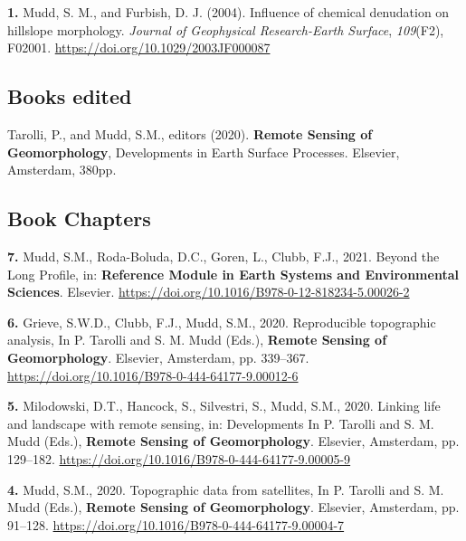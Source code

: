 \documentclass[10pt, a4paper]{article}
\newcommand{\years}[1]{\marginnote{\scriptsize #1}}
\begin{document}
\years{2004}\hangindent=0.7cm\textbf{1. }Mudd, S. M., and Furbish, D. J. (2004). Influence of chemical denudation on hillslope morphology. \textit{Journal of Geophysical Research-Earth Surface}, \textit{109}(F2), F02001. \href{https://doi.org/10.1029/2003JF000087}{https://doi.org/10.1029/2003JF000087}\par


\subsection*{Books edited}
\years{2020}\hangindent=0.7cm Tarolli, P., and Mudd, S.M., editors (2020). \textbf{Remote Sensing of Geomorphology}, Developments in Earth Surface Processes. Elsevier, Amsterdam, 380pp.

\subsection*{Book Chapters}
\noindent
\years{2021}\hangindent=0.7cm\textbf{7. }Mudd, S.M., Roda-Boluda, D.C., Goren, L., Clubb, F.J., 2021. Beyond the Long Profile, in: \textbf{Reference Module in Earth Systems and Environmental Sciences}. Elsevier. \href{https://doi.org/10.1016/B978-0-12-818234-5.00026-2}{https://doi.org/10.1016/B978-0-12-818234-5.00026-2}\par

\years{2020}\hangindent=0.7cm\textbf{6. }Grieve, S.W.D., Clubb, F.J., Mudd, S.M., 2020. Reproducible topographic analysis, In P. Tarolli and S. M. Mudd (Eds.), \textbf{Remote Sensing of Geomorphology}. Elsevier, Amsterdam, pp. 339–367. \href{https://doi.org/10.1016/B978-0-444-64177-9.00012-6}{https://doi.org/10.1016/B978-0-444-64177-9.00012-6}\par

\years{2020}\hangindent=0.7cm\textbf{5. }Milodowski, D.T., Hancock, S., Silvestri, S., Mudd, S.M., 2020. Linking life and landscape with remote sensing, in: Developments In P. Tarolli and S. M. Mudd (Eds.), \textbf{Remote Sensing of Geomorphology}. Elsevier, Amsterdam, pp. 129–182. \href{https://doi.org/10.1016/B978-0-444-64177-9.00005-9}{https://doi.org/10.1016/B978-0-444-64177-9.00005-9}\par

\years{2020}\hangindent=0.7cm\textbf{4. }Mudd, S.M., 2020. Topographic data from satellites, In P. Tarolli and S. M. Mudd (Eds.), \textbf{Remote Sensing of Geomorphology}. Elsevier, Amsterdam, pp. 91–128. \href{https://doi.org/10.1016/B978-0-444-64177-9.00004-7}{https://doi.org/10.1016/B978-0-444-64177-9.00004-7}\par
\end{document}
